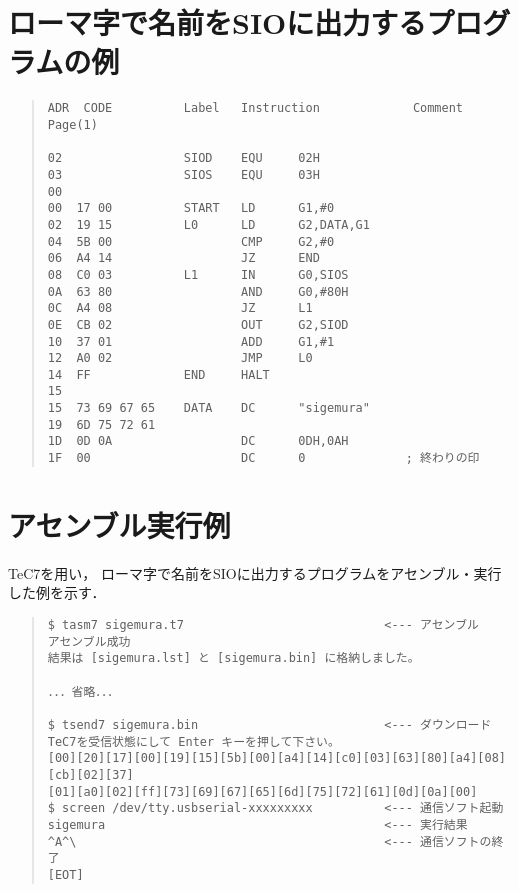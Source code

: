 \newpage
\section{ローマ字で名前をSIOに出力するプログラムの例}
\begin{quote}
\begin{verbatim}
ADR  CODE          Label   Instruction             Comment              Page(1)

02                 SIOD    EQU     02H            
03                 SIOS    EQU     03H            
00                 
00  17 00          START   LD      G1,#0          
02  19 15          L0      LD      G2,DATA,G1     
04  5B 00                  CMP     G2,#0          
06  A4 14                  JZ      END            
08  C0 03          L1      IN      G0,SIOS        
0A  63 80                  AND     G0,#80H        
0C  A4 08                  JZ      L1             
0E  CB 02                  OUT     G2,SIOD        
10  37 01                  ADD     G1,#1          
12  A0 02                  JMP     L0             
14  FF             END     HALT                   
15                 
15  73 69 67 65    DATA    DC      "sigemura"     
19  6D 75 72 61 
1D  0D 0A                  DC      0DH,0AH        
1F  00                     DC      0              ; 終わりの印
\end{verbatim}
\end{quote}

\section{アセンブル実行例}
TeC7を用い，
ローマ字で名前をSIOに出力するプログラムをアセンブル・実行した例を示す．
\begin{quote}
\begin{verbatim}
$ tasm7 sigemura.t7                            <--- アセンブル
アセンブル成功
結果は [sigemura.lst] と [sigemura.bin] に格納しました。

．．．省略．．．

$ tsend7 sigemura.bin                          <--- ダウンロード
TeC7を受信状態にして Enter キーを押して下さい。
[00][20][17][00][19][15][5b][00][a4][14][c0][03][63][80][a4][08][cb][02][37]
[01][a0][02][ff][73][69][67][65][6d][75][72][61][0d][0a][00]
$ screen /dev/tty.usbserial-xxxxxxxxx          <--- 通信ソフト起動
sigemura                                       <--- 実行結果
^A^\                                           <--- 通信ソフトの終了
[EOT]
\end{verbatim}
\end{quote}

